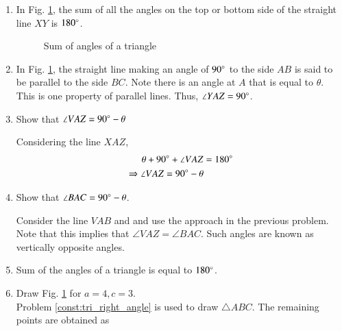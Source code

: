 \renewcommand{\theequation}{\theenumi}
\begin{enumerate}[label=\arabic*.,ref=\thesubsection.\theenumi]
\item 	In Fig. \ref{fig:tri_sum_angle}, the sum of all the angles on the top or bottom side of the straight line $XY$ is $180\degree$.


\begin{figure}[!ht]
	\begin{center}
		\resizebox{\columnwidth}{!}{}
	\end{center}
	\caption{Sum of angles of a triangle}
	\label{fig:tri_sum_angle}	
\end{figure}



\item
In Fig. \ref{fig:tri_sum_angle}, the straight line making an angle of $90\degree$ to the side $AB$ is said to be parallel to the side $BC$. Note there is an angle at $A$ that is equal to $\theta$.  This is one property of parallel lines.  Thus, $\angle YAZ = 90\degree$.


\item
	Show that $\angle VAZ = 90\degree - \theta$
		
	\solution Considering the line $XAZ$,
	\begin{align}
	\theta + 90\degree + \angle VAZ &= 180\degree \\
	\Rightarrow  \angle VAZ =  90\degree - \theta
	\end{align}

\item
	\label{prob:tri_compl_angle}
	Show that $\angle BAC = 90\degree - \theta$.
	
	\solution Consider the line $VAB$ and and use the approach in the previous problem.  Note that this implies that $\angle VAZ = \angle BAC$.  Such angles are known as vertically opposite angles. 
	 
\item
Sum of the angles of a triangle is equal to $180\degree$.
%
\item Draw Fig. \ref{fig:tri_sum_angle} for $a = 4, c =3$.
%
\\
\solution Problem \ref{const:tri_right_angle} is used to draw $\triangle ABC$.  The remaining points are obtained as


\end{enumerate}
